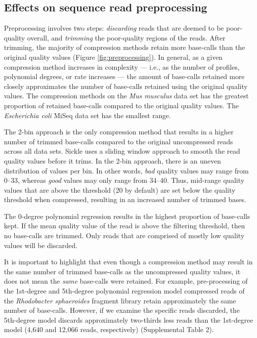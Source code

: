 \documentclass{bioinfo}
\begin{document}
\subsection{Effects on sequence read preprocessing}

Preprocessing involves two steps: \emph{discarding} reads that are
deemed to be poor-quality overall, and \emph{trimming} the
poor-quality regions of the reads. After trimming, the majority of
compression methods retain more base-calls than the original quality
values (Figure \ref{fig:preprocessing}). In general, as a given
compression method increases in complexity --- i.e., as the number of
profiles, polynomial degrees, or rate increases --- the amount of
base-calls retained more closely approximates the number of base-calls
retained using the original quality values. The compression methods on
the \textit{Mus musculus} data set has the greatest proportion of
retained base-calls compared to the original quality values. The
\textit{Escherichia coli} MiSeq data set has the smallest range.

The 2-bin approach is the only compression method that results in a
higher number of trimmed base-calls compared to the original
uncompressed reads across all data sets. Sickle uses a sliding window
approach to smooth the read quality values before it trims. In the
2-bin approach, there is an uneven distribution of values per bin. In
other words, \emph{bad} quality values may range from 0--33, whereas
\emph{good} values may only range from 34--40. Thus, mid-range quality
values that are above the threshold (20 by default) are set below the
quality threshold when compressed, resulting in an increased number of
trimmed bases.

The 0-degree polynomial regression results in the highest proportion
of base-calls kept. If the mean quality value of the read is above the
filtering threshold, then no base-calls are trimmed. Only reads that
are comprised of mostly low quality values will be discarded.

It is important to highlight that even though a compression method may
result in the same number of trimmed base-calls as the uncompressed
quality values, it does not mean the \emph{same} base-calls were
retained.  For example, pre-processing of the 1st-degree and
5th-degree polynomial regression model compressed reads of the
\textit{Rhodobacter sphaeroides} fragment library retain approximately
the same number of base-calls. However, if we examine the specific
reads discarded, the 5th-degree model discards approximately
two-thirds less reads than the 1st-degree model (4,640 and 12,066
reads, respectively) (Supplemental Table 2).
\end{document}
